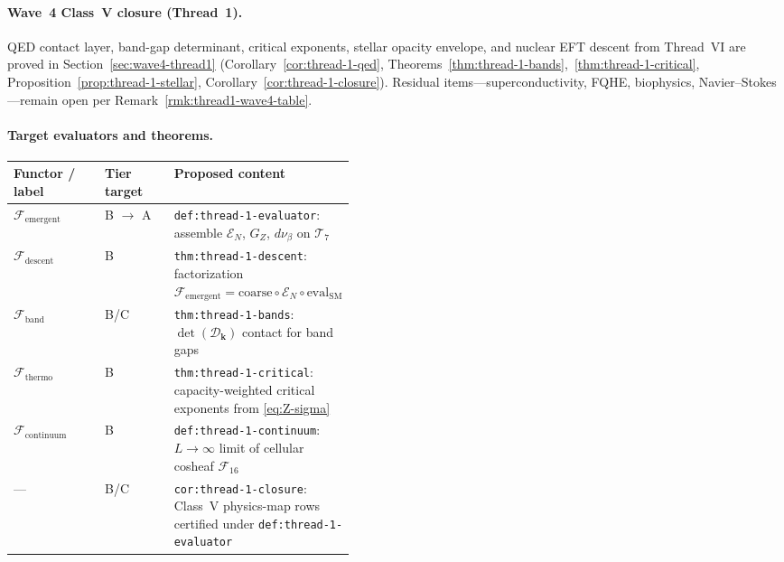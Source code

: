 \paragraph{Wave~4 Class~V closure (Thread~1).}
QED contact layer, band-gap determinant, critical exponents, stellar opacity
envelope, and nuclear EFT descent from Thread~VI are proved in
Section~\ref{sec:wave4-thread1}
(Corollary~\ref{cor:thread-1-qed},
Theorems~\ref{thm:thread-1-bands},~\ref{thm:thread-1-critical},
Proposition~\ref{prop:thread-1-stellar},
Corollary~\ref{cor:thread-1-closure}).
Residual items---superconductivity, FQHE, biophysics, Navier--Stokes---remain
open per Remark~\ref{rmk:thread1-wave4-table}.

\paragraph{Target evaluators and theorems.}
\begin{center}
\small
\renewcommand{\arraystretch}{1.12}
\begin{tabular}{@{}llp{0.44\linewidth}@{}}
\toprule
\textbf{Functor / label} & \textbf{Tier target} & \textbf{Proposed content} \\
\midrule
$\mathcal{F}_{\mathrm{emergent}}$ &
  B $\to$ A &
  \texttt{def:thread-1-evaluator}: assemble
  $\mathcal{E}_N$, $G_Z$, $d\nu_\beta$ on $\mathcal{T}_7$ \\
$\mathcal{F}_{\mathrm{descent}}$ &
  B &
  \texttt{thm:thread-1-descent}: factorization
  $\mathcal{F}_{\mathrm{emergent}}=
  \mathrm{coarse}\circ\mathcal{E}_N\circ\mathrm{eval}_{\mathrm{SM}}$ \\
$\mathcal{F}_{\mathrm{band}}$ &
  B/C &
  \texttt{thm:thread-1-bands}: $\det(\mathcal{D}_{\mathbf{k}})$ contact
  for band gaps \\
$\mathcal{F}_{\mathrm{thermo}}$ &
  B &
  \texttt{thm:thread-1-critical}: capacity-weighted critical exponents
  from \eqref{eq:Z-sigma} \\
$\mathcal{F}_{\mathrm{continuum}}$ &
  B &
  \texttt{def:thread-1-continuum}: $L\to\infty$ limit of cellular cosheaf
  $\mathcal{F}_{16}$ \\
--- &
  B/C &
  \texttt{cor:thread-1-closure}: Class~V physics-map rows certified
  under \texttt{def:thread-1-evaluator} \\
\bottomrule
\end{tabular}
\end{center}

